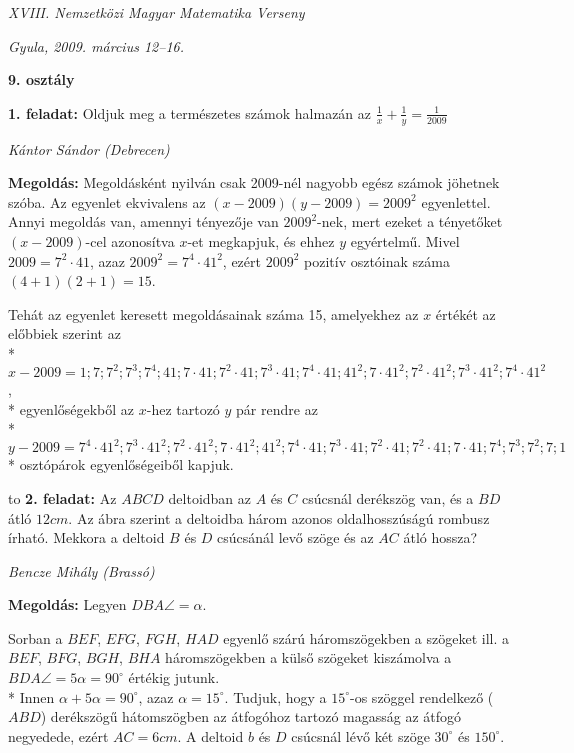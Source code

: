 \documentclass[a4paper,10pt]{article}
\def\ki#1#2{\hfill {\it #1 (#2)}\medskip}
\begin{document}
\begin{center} \Large {\em XVIII. Nemzetközi Magyar Matematika Verseny} \end{center}
\begin{center} \large{\em Gyula, 2009. március 12--16. } \end{center}
\smallskip
\begin{center} \large{\bf 9. osztály} \end{center}
\bigskip 

{\bf 1. feladat: } Oldjuk meg a természetes számok halmazán az $\frac1x+\frac1y=\frac{1}{2009}$

\ki{Kántor Sándor}{Debrecen}\medskip


{\bf Megoldás: } Megoldásként nyilván csak 2009-nél nagyobb egész számok jöhetnek szóba. Az egyenlet ekvivalens az $(x-2009)(y-2009)=2009^2$ egyenlettel. Annyi megoldás van, amennyi tényezője van $2009^2$-nek, mert ezeket a tényetőket $(x-2009)$-cel azonosítva $x$-et megkapjuk, és ehhez $y$ egyértelmű. Mivel $2009=7^2\cdot 41$, azaz $2009^2=7^4\cdot 41^2 $, ezért $2009^2$ pozitív osztóinak száma $(4+1)(2+1)=15$.

Tehát az egyenlet keresett megoldásainak száma 15, amelyekhez az $x$ értékét az előbbiek szerint az\\*
$x-2009=1;7;7^2;7^3;7^4;41;7\cdot41;7^2\cdot41;7^3\cdot41;7^4\cdot41;41^2;7\cdot41^2;7^2\cdot41^2;7^3\cdot41^2;7^4\cdot41^2$,  \\*
egyenlőségekből az $x$-hez tartozó $y$ pár rendre az \\*
$y-2009=7^4\cdot41^2;7^3\cdot41^2;7^2\cdot41^2;7\cdot41^2;41^2;7^4\cdot41;7^3\cdot41;7^2\cdot41;7^2\cdot41;7\cdot41;7^4;7^3;7^2;7;1$ \\*
osztópárok egyenlőségeiből kapjuk.
\medskip


\hbox to 
{\bf 2. feladat: } Az $ABCD$ deltoidban az $A$ és $C$ csúcsnál derékszög van, és a $BD$ átló $12 cm$. Az ábra szerint a deltoidba három azonos oldalhosszúságú rombusz írható. Mekkora a deltoid $B$ és $D$ csúcsánál levő szöge és az $AC$ átló
hossza?

\ki{Bencze Mihály}{Brassó}\medskip

{\bf Megoldás: } Legyen $DBA\angle=\alpha$.

Sorban a $BEF$, $EFG$, $FGH$, $HAD$ egyenlő szárú háromszögekben a szögeket ill. a $BEF$, $BFG$, $BGH$, $BHA$ háromszögekben a külső szögeket kiszámolva a $BDA\angle=5\alpha=90^{\circ}$ értékig jutunk. \\*
Innen $\alpha+5\alpha=90^\circ $, azaz $\alpha=15^\circ$. Tudjuk, hogy a $15^\circ$-os szöggel rendelkező ($ABD$) derékszögű hátomszögben az átfogóhoz tartozó magasság az átfogó negyedede, ezért $AC=6 cm$. A deltoid $b$ és $D$ csúcsnál lévő két szöge $30^\circ$ és $150^\circ$.
\medskip
\end{document}
